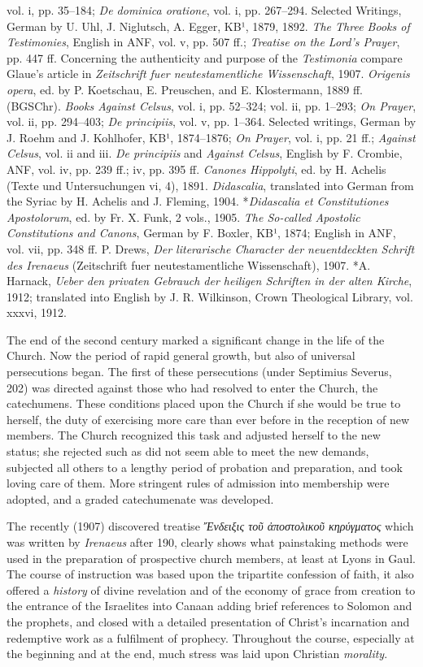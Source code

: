vol. i, pp. 35–184; \emph{De dominica oratione}, vol. i, pp. 267–294. Selected Writings, German by U. Uhl, J. Niglutsch, A. Egger, KB¹, 1879, 1892. \emph{The Three Books of Testimonies}, English in ANF, vol. v, pp. 507 ff.; \emph{Treatise on the Lord’s Prayer}, pp. 447 ff. Concerning the authenticity and purpose of the \emph{Testimonia} compare Glaue’s article in \emph{Zeitschrift fuer neutestamentliche Wissenschaft}, 1907. \emph{Origenis opera}, ed. by P. Koetschau, E. Preuschen, and E. Klostermann, 1889 ff. (BGSChr). \emph{Books Against Celsus}, vol. i, pp. 52–324; vol. ii, pp. 1–293; \emph{On Prayer}, vol. ii, pp. 294–403; \emph{De principiis}, vol. v, pp. 1–364. Selected writings, German by J. Roehm and J. Kohlhofer, KB¹, 1874–1876; \emph{On Prayer}, vol. i, pp. 21 ff.; \emph{Against Celsus}, vol. ii and iii. \emph{De principiis} and \emph{Against Celsus}, English by F. Crombie, ANF, vol. iv, pp. 239 ff.; iv, pp. 395 ff. \emph{Canones Hippolyti}, ed. by H. Achelis (Texte und Untersuchungen vi, 4), 1891. \emph{Didascalia}, translated into German from the Syriac by H. Achelis and J. Fleming, 1904. *\emph{Didascalia et Constitutiones Apostolorum}, ed. by Fr. X. Funk, 2 vols., 1905. \emph{The So-called Apostolic Constitutions and Canons}, German by F. Boxler, KB¹, 1874; English in ANF, vol. vii, pp. 348 ff. P. Drews, \emph{Der literarische Character der neuentdeckten Schrift des Irenaeus} (Zeitschrift fuer neutestamentliche Wissenschaft), 1907. *A. Harnack, \emph{Ueber den privaten Gebrauch der heiligen Schriften in der alten Kirche}, 1912; translated into English by J. R. Wilkinson, Crown Theological Library, vol. xxxvi, 1912.

The end of the second century marked a significant change in the life of the Church. Now the period of rapid general growth, but also of universal persecutions began. The first of these persecutions (under Septimius Severus, 202) was directed against those who had resolved to enter the Church, the catechumens. These conditions placed upon the Church if she would be true to herself, the duty of exercising more care than ever before in the reception of new members. The Church recognized this task and adjusted herself to the new status; she rejected such as did not seem able to meet the new demands, subjected all others to a lengthy period of probation and preparation, and took loving care of them. More stringent rules of admission into membership were adopted, and a graded catechumenate was developed.

The recently (1907) discovered treatise \emph{Ἔνδειξις τοῦ ἀποστολικοῦ κηρύγματος} which was written by \emph{Irenaeus} after 190, clearly shows what painstaking methods were used in the preparation of prospective church members, at least at Lyons in Gaul. The course of instruction was based upon the tripartite confession of faith, it also offered a \emph{history} of divine revelation and of the economy of grace from creation to the entrance of the Israelites into Canaan adding brief references to Solomon and the prophets, and closed with a detailed presentation of Christ’s incarnation and redemptive work as a fulfilment of prophecy. Throughout the course, especially at the beginning and at the end, much stress was laid upon Christian \emph{morality}.

